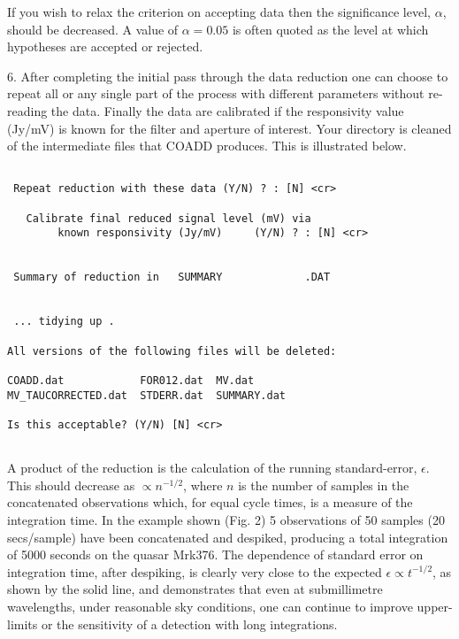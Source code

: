 If you wish  to relax the criterion on accepting data then the significance
level, $\alpha$, should be decreased. A value of $\alpha = 0.05$ is often
quoted as the level at which hypotheses are accepted or rejected.

6. After completing the initial pass through the data reduction one can choose
to repeat all or any single part of the process with different parameters
without re-reading the data. Finally the data are calibrated if the
responsivity value (Jy/mV) is known for the filter and aperture of interest.
Your directory is cleaned of the intermediate files that COADD produces.
This is illustrated below.

\begin{verbatim}

 Repeat reduction with these data (Y/N) ? : [N] <cr>

   Calibrate final reduced signal level (mV) via
        known responsivity (Jy/mV)     (Y/N) ? : [N] <cr>


 Summary of reduction in   SUMMARY             .DAT


 ... tidying up .

All versions of the following files will be deleted:

COADD.dat            FOR012.dat  MV.dat
MV_TAUCORRECTED.dat  STDERR.dat  SUMMARY.dat

Is this acceptable? (Y/N) [N] <cr>


\end{verbatim}


A product of the reduction is the calculation of the running standard-error,
$\epsilon $. This should decrease as $\propto n^{-1/2}$, where $n$ is the
number of samples in the concatenated observations which, for equal cycle
times, is a measure of the integration time. In the example shown (Fig. 2)
5 observations of 50 samples (20
secs/sample) have been concatenated and despiked, producing a total
integration of 5000 seconds
on the quasar Mrk376. The dependence of standard error on integration time,
after despiking,
is clearly very close to the expected $\epsilon \propto t^{-1/2}$, as shown by
the solid line, and demonstrates that even at submillimetre wavelengths, under
reasonable sky conditions, one can continue to improve upper-limits or
the sensitivity of a detection with long integrations.






